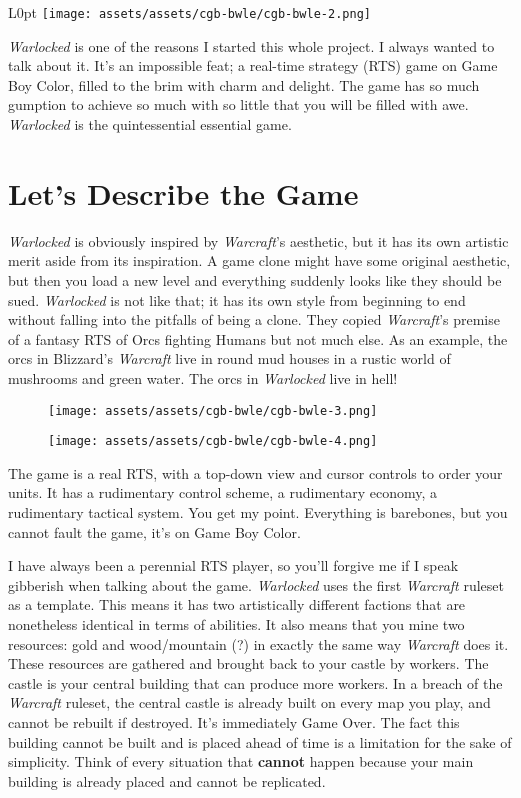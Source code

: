 \documentclass{book}
\begin{document}
\begin{wrapfigure}{L}{0pt} \texttt{[image: assets/assets/cgb-bwle/cgb-bwle-2.png]}\end{wrapfigure}
\emph{Warlocked} is one of the reasons I started this whole project. I always wanted to talk about it. It’s an impossible feat; a real-time strategy (RTS) game on Game Boy Color, filled to the brim with charm and delight. The game has so much gumption to achieve so much with so little that you will be filled with awe. \emph{Warlocked} is the quintessential essential game.

\FloatBarrier\needspace{5pt}\section*{Let’s Describe the Game}\nopagebreak[4]

\emph{Warlocked} is obviously inspired by \emph{Warcraft}’s aesthetic, but it has its own artistic merit aside from its inspiration. A game clone might have some original aesthetic, but then you load a new level and everything suddenly looks like they should be sued. \emph{Warlocked} is not like that; it has its own style from beginning to end without falling into the pitfalls of being a clone. They copied \emph{Warcraft}’s premise of a fantasy RTS of Orcs fighting Humans but not much else. As an example, the orcs in Blizzard’s \emph{Warcraft} live in round mud houses in a rustic world of mushrooms and green water. The orcs in \emph{Warlocked} live in hell!

\begin{figure}[hbt]
\vskip 10pt
\centering \texttt{[image: assets/assets/cgb-bwle/cgb-bwle-3.png]}
\vskip 6pt
\end{figure}
\begin{figure}[hbt]
\vskip 10pt
\centering \texttt{[image: assets/assets/cgb-bwle/cgb-bwle-4.png]}
\vskip 6pt
\end{figure}

The game is a real RTS, with a top-down view and cursor controls to order your units. It has a rudimentary control scheme, a rudimentary economy, a rudimentary tactical system. You get my point. Everything is barebones, but you cannot fault the game, it’s on Game Boy Color.

I have always been a perennial RTS player, so you’ll forgive me if I speak gibberish when talking about the game. \emph{Warlocked} uses the first \emph{Warcraft} ruleset as a template. This means it has two artistically different factions that are nonetheless identical in terms of abilities. It also means that you mine two resources: gold and wood/mountain (?) in exactly the same way \emph{Warcraft} does it. These resources are gathered and brought back to your castle by workers. The castle is your central building that can produce more workers. In a breach of the \emph{Warcraft} ruleset, the central castle is already built on every map you play, and cannot be rebuilt if destroyed. It’s immediately Game Over. The fact this building cannot be built and is placed ahead of time is a limitation for the sake of simplicity. Think of every situation that \textbf{cannot} happen because your main building is already placed and cannot be replicated.
\end{document}
